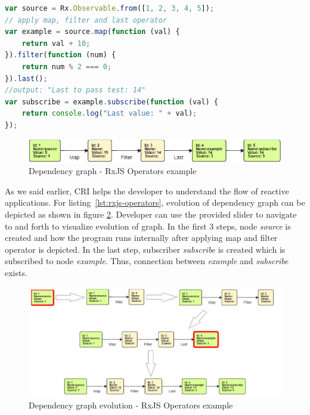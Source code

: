 \begin{lstlisting}[language=JavaScript, caption=RxJS - Operators example, label={lst:rxjs-operators}]
var source = Rx.Observable.from([1, 2, 3, 4, 5]);
// apply map, filter and last operator
var example = source.map(function (val) {
	return val + 10;
}).filter(function (num) {
	return num % 2 === 0;
}).last();
//output: "Last to pass test: 14"
var subscribe = example.subscribe(function (val) {
	return console.log("Last value: " + val);
});
\end{lstlisting}

\begin{figure}[!h]
	\centering
	\includegraphics[scale=0.7,trim=0 0 0 0]{images/RxJS-operators/final.png}
	\caption{Dependency graph - RxJS Operators example}
	\label{fig:rxjs-operators-dg}
\end{figure}

As we said earlier, CRI helps the developer to understand the flow of reactive applications. For listing~\ref{lst:rxjs-operators}, evolution of dependency graph can be depicted as shown in figure \ref{fig:rxjs-operators-dg-evolution}. Developer can use the provided slider to navigate to and forth to visualize evolution of graph. In the first 3 steps, node \textit{source} is created and how the program runs internally after applying map and filter operator is depicted. In the last step, subscriber \textit{subscribe} is created which is subscribed to node \textit{example}. Thus, connection between \textit{example} and \textit{subscribe} exists.

\begin{figure}[!h]
	\centering
	\includegraphics[scale=0.7,trim=0 0 0 0]{images/RxJS-operators/steps-all.png}
	\caption{Dependency graph evolution - RxJS Operators example}
	\label{fig:rxjs-operators-dg-evolution}
\end{figure}

